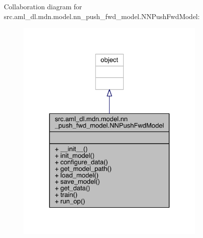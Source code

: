 Collaboration diagram for src.\+aml\+\_\+dl.\+mdn.\+model.\+nn\+\_\+push\+\_\+fwd\+\_\+model.\+N\+N\+Push\+Fwd\+Model\+:\nopagebreak
\begin{figure}[H]
\begin{center}
\leavevmode
\includegraphics[width=263pt]{classsrc_1_1aml__dl_1_1mdn_1_1model_1_1nn__push__fwd__model_1_1_n_n_push_fwd_model__coll__graph}
\end{center}
\end{figure}
